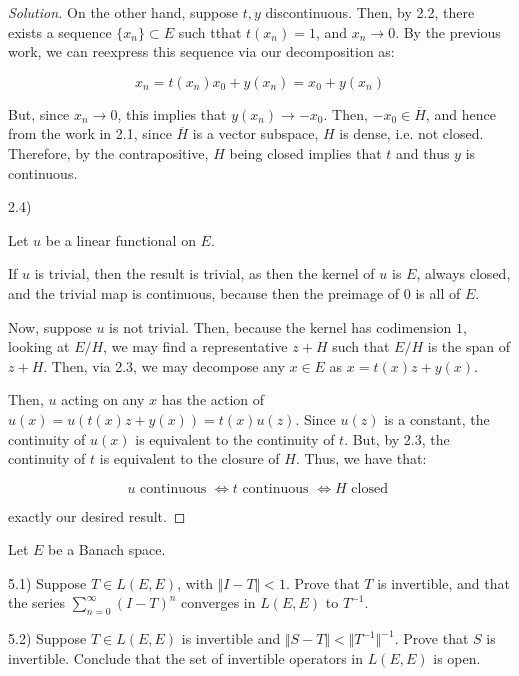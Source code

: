 \documentclass[10pt]{article}
\newenvironment{problem}[2][]{\begin{trivlist}
\item[\hskip \labelsep {\bfseries #1}\hskip \labelsep {\bfseries #2.}]}{\end{trivlist}}
\begin{document}
\begin{proof}[Solution]
On the other hand, suppose $t, y$ discontinuous. Then, by 2.2, there exists a sequence $\{ x_n \} \subset E$ such tthat $t(x_n) = 1$, and $x_n \to 0$. By the previous work, we can reexpress this sequence via our decomposition as:

$$ x_n = t(x_n)x_0  + y(x_n) = x_0 + y(x_n) $$

But, since $x_n \to 0$, this implies that $y(x_n) \to -x_0$. Then, $-x_0 \in \overline{H}$, and hence from the work in 2.1, since $\overline{H}$ is a vector subspace, $H$ is dense, i.e. not closed. Therefore, by the contrapositive, $H$ being closed implies that $t$ and thus $y$ is continuous.

2.4)

Let $u$ be a linear functional on $E$.

If $u$ is trivial, then the result is trivial, as then the kernel of $u$ is $E$, always closed, and the trivial map is continuous, because then the preimage of 0 is all of $E$.

Now, suppose $u$ is not trivial. Then, because the kernel has codimension $1$, looking at $E/H$, we may find a representative $z + H$ such that $E/H$ is the span of $z + H$. Then, via 2.3, we may decompose any $x \in E$ as $x = t(x)z + y(x)$.

Then, $u$ acting on any $x$ has the action of $u(x) = u(t(x)z + y(x)) = t(x)u(z)$. Since $u(z)$ is a constant, the continuity of $u(x)$ is equivalent to the continuity of $t$. But, by 2.3, the continuity of $t$ is equivalent to the closure of $H$. Thus, we have that:

$$ u \text{ continuous } \iff t \text{ continuous } \iff H \text{ closed }$$

exactly our desired result.
\end{proof}

\begin{problem}{Question 5}

Let $E$ be a Banach space.

5.1) Suppose $T \in L(E,E)$, with $\Vert I - T \Vert < 1$. Prove that $T$ is invertible, and that the series $\sum_{n=0}^\infty (I - T)^n$ converges in $L(E,E)$ to $T^{-1}$.

5.2) Suppose $T \in L(E,E)$ is invertible and $\Vert S - T \Vert < \Vert T^{-1}\Vert^{-1}$. Prove that $S$ is invertible. Conclude that the set of invertible operators in $L(E,E)$ is open.

\end{problem}
\end{document}
